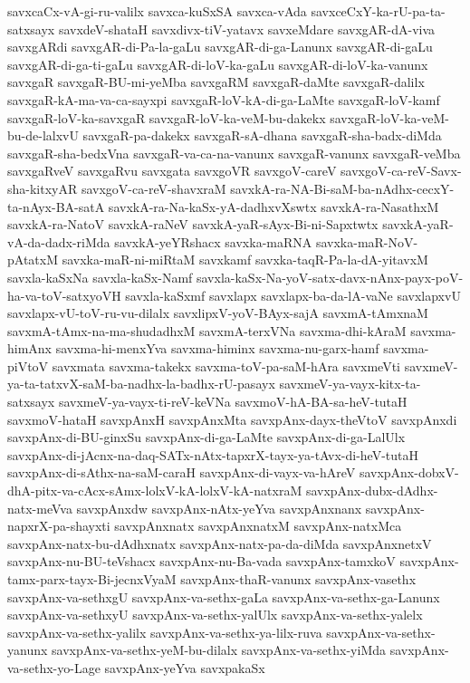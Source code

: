 {savxcaCx-vA-gi-ru-valilx
savxca-kuSxSA
savxca-vAda
savxceCxY-ka-rU-pa-ta-satxsayx
savxdeV-shataH
savxdivx-tiV-yatavx
savxeMdare
savxgAR-dA-viva
savxgARdi
savxgAR-di-Pa-la-gaLu
savxgAR-di-ga-Lanunx
savxgAR-di-gaLu
savxgAR-di-ga-ti-gaLu
savxgAR-di-loV-ka-gaLu
savxgAR-di-loV-ka-vanunx
savxgaR
savxgaR-BU-mi-yeMba
savxgaRM
savxgaR-daMte
savxgaR-dalilx
savxgaR-kA-ma-va-ca-sayxpi
savxgaR-loV-kA-di-ga-LaMte
savxgaR-loV-kamf
savxgaR-loV-ka-savxgaR
savxgaR-loV-ka-veM-bu-dakekx
savxgaR-loV-ka-veM-bu-de-lalxvU
savxgaR-pa-dakekx
savxgaR-sA-dhana
savxgaR-sha-badx-diMda
savxgaR-sha-bedxVna
savxgaR-va-ca-na-vanunx
savxgaR-vanunx
savxgaR-veMba
savxgaRveV
savxgaRvu
savxgata
savxgoVR
savxgoV-careV
savxgoV-ca-reV-Savx-sha-kitxyAR
savxgoV-ca-reV-shavxraM
savxkA-ra-NA-Bi-saM-ba-nAdhx-cecxY-ta-nAyx-BA-satA
savxkA-ra-Na-kaSx-yA-dadhxvXswtx
savxkA-ra-NasathxM
savxkA-ra-NatoV
savxkA-raNeV
savxkA-yaR-sAyx-Bi-ni-Sapxtwtx
savxkA-yaR-vA-da-dadx-riMda
savxkA-yeYRshacx
savxka-maRNA
savxka-maR-NoV-pAtatxM
savxka-maR-ni-miRtaM
savxkamf
savxka-taqR-Pa-la-dA-yitavxM
savxla-kaSxNa
savxla-kaSx-Namf
savxla-kaSx-Na-yoV-satx-davx-nAnx-payx-poV-ha-va-toV-satxyoVH
savxla-kaSxmf
savxlapx
savxlapx-ba-da-lA-vaNe
savxlapxvU
savxlapx-vU-toV-ru-vu-dilalx
savxlipxV-yoV-BAyx-sajA
savxmA-tAmxnaM
savxmA-tAmx-na-ma-shudadhxM
savxmA-terxVNa
savxma-dhi-kAraM
savxma-himAnx
savxma-hi-menxYva
savxma-himinx
savxma-nu-garx-hamf
savxma-piVtoV
savxmata
savxma-takekx
savxma-toV-pa-saM-hAra
savxmeVti
savxmeV-ya-ta-tatxvX-saM-ba-nadhx-la-badhx-rU-pasayx
savxmeV-ya-vayx-kitx-ta-satxsayx
savxmeV-ya-vayx-ti-reV-keVNa
savxmoV-hA-BA-sa-heV-tutaH
savxmoV-hataH
savxpAnxH
savxpAnxMta
savxpAnx-dayx-theVtoV
savxpAnxdi
savxpAnx-di-BU-ginxSu
savxpAnx-di-ga-LaMte
savxpAnx-di-ga-LalUlx
savxpAnx-di-jAcnx-na-daq-SATx-nAtx-tapxrX-tayx-ya-tAvx-di-heV-tutaH
savxpAnx-di-sAthx-na-saM-caraH
savxpAnx-di-vayx-va-hAreV
savxpAnx-dobxV-dhA-pitx-va-cAcx-sAmx-lolxV-kA-lolxV-kA-natxraM
savxpAnx-dubx-dAdhx-natx-meVva
savxpAnxdw
savxpAnx-nAtx-yeYva
savxpAnxnanx
savxpAnx-napxrX-pa-shayxti
savxpAnxnatx
savxpAnxnatxM
savxpAnx-natxMca
savxpAnx-natx-bu-dAdhxnatx
savxpAnx-natx-pa-da-diMda
savxpAnxnetxV
savxpAnx-nu-BU-teVshacx
savxpAnx-nu-Ba-vada
savxpAnx-tamxkoV
savxpAnx-tamx-parx-tayx-Bi-jecnxVyaM
savxpAnx-thaR-vanunx
savxpAnx-vasethx
savxpAnx-va-sethxgU
savxpAnx-va-sethx-gaLa
savxpAnx-va-sethx-ga-Lanunx
savxpAnx-va-sethxyU
savxpAnx-va-sethx-yalUlx
savxpAnx-va-sethx-yalelx
savxpAnx-va-sethx-yalilx
savxpAnx-va-sethx-ya-lilx-ruva
savxpAnx-va-sethx-yanunx
savxpAnx-va-sethx-yeM-bu-dilalx
savxpAnx-va-sethx-yiMda
savxpAnx-va-sethx-yo-Lage
savxpAnx-yeYva
savxpakaSx
}
